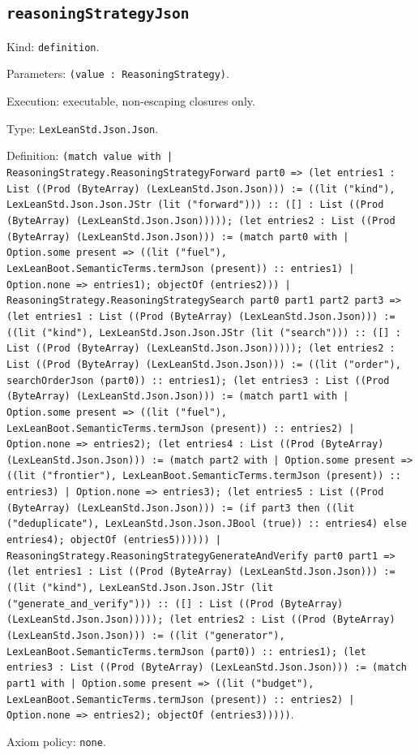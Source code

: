 \documentclass[11pt]{article}
\begin{document}
\subsection*{\texttt{reasoningStrategyJson}}
\noindent Kind: \texttt{definition}.\par
\noindent Parameters: \texttt{(value : ReasoningStrategy)}.\par
\noindent Execution: executable, non-escaping closures only.\par
\noindent Type: \texttt{LexLeanStd.Json.Json}.\par
\noindent Definition: \texttt{(match value with | ReasoningStrategy.ReasoningStrategyForward part0 => (let entries1 : List ((Prod (ByteArray) (LexLeanStd.Json.Json))) := ((lit ("kind"), LexLeanStd.Json.Json.JStr (lit ("forward"))) :: ([] : List ((Prod (ByteArray) (LexLeanStd.Json.Json))))); (let entries2 : List ((Prod (ByteArray) (LexLeanStd.Json.Json))) := (match part0 with | Option.some present => ((lit ("fuel"), LexLeanBoot.SemanticTerms.termJson (present)) :: entries1) | Option.none => entries1); objectOf (entries2))) | ReasoningStrategy.ReasoningStrategySearch part0 part1 part2 part3 => (let entries1 : List ((Prod (ByteArray) (LexLeanStd.Json.Json))) := ((lit ("kind"), LexLeanStd.Json.Json.JStr (lit ("search"))) :: ([] : List ((Prod (ByteArray) (LexLeanStd.Json.Json))))); (let entries2 : List ((Prod (ByteArray) (LexLeanStd.Json.Json))) := ((lit ("order"), searchOrderJson (part0)) :: entries1); (let entries3 : List ((Prod (ByteArray) (LexLeanStd.Json.Json))) := (match part1 with | Option.some present => ((lit ("fuel"), LexLeanBoot.SemanticTerms.termJson (present)) :: entries2) | Option.none => entries2); (let entries4 : List ((Prod (ByteArray) (LexLeanStd.Json.Json))) := (match part2 with | Option.some present => ((lit ("frontier"), LexLeanBoot.SemanticTerms.termJson (present)) :: entries3) | Option.none => entries3); (let entries5 : List ((Prod (ByteArray) (LexLeanStd.Json.Json))) := (if part3 then ((lit ("deduplicate"), LexLeanStd.Json.Json.JBool (true)) :: entries4) else entries4); objectOf (entries5)))))) | ReasoningStrategy.ReasoningStrategyGenerateAndVerify part0 part1 => (let entries1 : List ((Prod (ByteArray) (LexLeanStd.Json.Json))) := ((lit ("kind"), LexLeanStd.Json.Json.JStr (lit ("generate\_and\_verify"))) :: ([] : List ((Prod (ByteArray) (LexLeanStd.Json.Json))))); (let entries2 : List ((Prod (ByteArray) (LexLeanStd.Json.Json))) := ((lit ("generator"), LexLeanBoot.SemanticTerms.termJson (part0)) :: entries1); (let entries3 : List ((Prod (ByteArray) (LexLeanStd.Json.Json))) := (match part1 with | Option.some present => ((lit ("budget"), LexLeanBoot.SemanticTerms.termJson (present)) :: entries2) | Option.none => entries2); objectOf (entries3)))))}.\par
\noindent Axiom policy: \texttt{none}.\par
\end{document}
